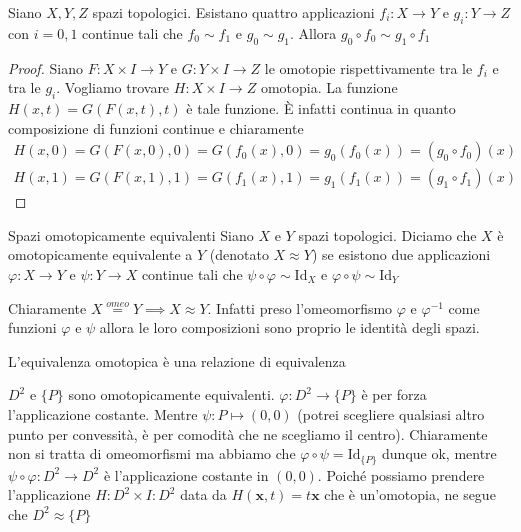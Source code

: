 \begin{proposition}
    Siano \(X, Y, Z\) spazi topologici. Esistano quattro applicazioni \(f_{i} :
    X \to Y\) e \(g_{i}: Y \to Z\) con \(i = 0, 1\) continue tali che \(f_{0}
    \sim f_{1}\) e \(g_{0} \sim g_{1}\). Allora \(g_{0} \circ f_{0} \sim g_{1}
    \circ f_{1}\) 
\end{proposition}
\begin{proof}
    Siano \(F : X \times I \to Y\)  e \(G : Y \times I \to Z\) le
    omotopie rispettivamente tra le \(f_{i}\) e tra le \(g_{i}\). Vogliamo
    trovare \(H : X \times I \to Z\)
    omotopia. La funzione \(H(x, t) = G(F{(x, t)}, t)\) è tale funzione.
    È infatti continua in quanto composizione di funzioni continue e chiaramente
    \begin{align*}
      H(x, 0) = G{(F{(x, 0)}, 0)} = G{(f_{0}{(x)}, 0)} = g_{0}{(f_{0}{(x)})} =
      {(g_{0} \circ f_{0})}{(x)} \\
      H{(x, 1)} = G{(F{(x, 1)}, 1)} = G{(f_{1}{(x)}, 1)} = g_{1}{(f_{1}{(x)})} =
      {(g_{1} \circ f_{1})}{(x)}
    \end{align*}
\end{proof}
\begin{definition}{Spazi omotopicamente equivalenti}
    Siano \(X\) e \(Y\) spazi topologici. Diciamo che \(X\) è omotopicamente
    equivalente a \(Y\) (denotato \(X \approx Y\)) se esistono due applicazioni
    \(\varphi : X \to Y\) e \(\psi : Y \to  X\) continue tali che \(\psi \circ
    \varphi \sim \mathrm{Id}_X\) e \(\varphi \circ \psi \sim \mathrm{Id}_Y\) 
\end{definition}

\begin{remark}
    Chiaramente \(X \overset{omeo}{=} Y \implies X \approx Y\). Infatti preso
    l'omeomorfismo \(\varphi \) e \(\varphi ^{-1}\) come funzioni \(\varphi \) e
    \(\psi\) allora le loro composizioni sono proprio le identità degli spazi.
\end{remark}
\begin{remark}
    L'equivalenza omotopica è una relazione di equivalenza
\end{remark}

\begin{example}
    \(D^2\) e \(\{P\}\) sono omotopicamente equivalenti.
    \(\varphi : D^2 \to \{P\} \) è per forza l'applicazione costante.
    Mentre \(\psi: P \mapsto (0,0)\) (potrei scegliere qualsiasi altro punto per
    convessità, è per comodità che ne scegliamo il centro). Chiaramente non si
    tratta di omeomorfismi ma abbiamo che \(\varphi \circ \psi =
    \mathrm{Id}_{\{P\} } \) dunque ok, mentre \(\psi \circ \varphi : D^2 \to D^2
    \) è l'applicazione costante in \({(0,0)}\). Poiché possiamo prendere
    l'applicazione \(H : D^2 \times I : D^2\) data da \(H(\mathbf{x} , t) = t
    \mathbf{x} \) che è un'omotopia, ne segue che \(D^2 \approx \{P\} \) 
\end{example}

